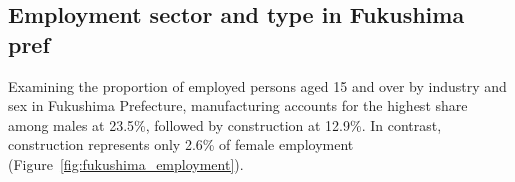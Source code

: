 \documentclass[a4paper,12pt]{article}
\begin{document}
\subsection{Employment sector and type in Fukushima pref}
\label{sec4.1}

Examining the proportion of employed persons aged 15 and over by industry and sex in Fukushima Prefecture, manufacturing accounts for the highest share among males at 23.5\%, followed by construction at 12.9\%. In contrast, construction represents only 2.6\% of female employment (Figure~\ref{fig:fukushima_employment}).


\end{document}
